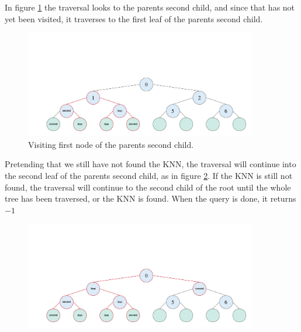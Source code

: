 \noindent In figure \ref{fig:t3} the traversal looks to the parents second child, and since that has not yet been visited, it traverses to the first leaf of the parents second child.  


\begin{figure}[H]
\centering
\includegraphics[width=0.9\textwidth]{pics/kd-tree-visual/7.png}
\caption{Visiting first node of the parents second child.}
\label{fig:t3}
\end{figure}

\noindent Pretending that we still have not found the KNN, the traversal will continue into the second leaf of the parents second child, as in figure \ref{fig:t5}. If the KNN is still not found, the traversal will continue to the second child of the root until the whole tree has been traversed, or the KNN is found. When the query is done, it returns $-1$




\begin{figure}[H]
\centering
\includegraphics[width=0.9\textwidth]{pics/kd-tree-visual/11.png}
\caption{}
\label{fig:t5}
\end{figure}




